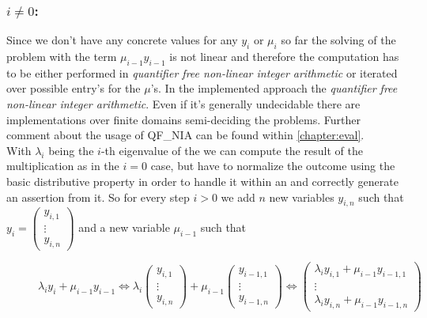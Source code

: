 \subsubsection{$i \ne 0$:}
Since we don't have any concrete values for any $y_i$ or $\mu_i$ so far the solving of the problem with the term $\mu_{i-1}y_{i-1}$ is not linear and therefore the computation has to be either performed in \textit{quantifier free non-linear integer arithmetic} or iterated over possible entry's for the $\mu$'s.\newline
In the implemented approach the \textit{quantifier free non-linear integer arithmetic}. Even if it's generally undecidable there are implementations over finite domains semi-deciding the problems. \cite{behrmann2014bit} \cite{giesl2016} \newline
Further comment about the usage of QF\_NIA can be found within \autoref{chapter:eval}.
\\
With $\lambda_i$ being the $i$-th eigenvalue of the \updatematrix we can compute the result of the multiplication as in the $i=0$ case, but have to normalize the outcome using the basic distributive property in order to handle it within an \rpntree and correctly generate an assertion from it.\newline
So for every step $i > 0$ we add $n$ new variables $y_{i,n}$ such that $y_i = \begin{pmatrix} y_{i,1} \\ \vdots \\ y_{i,n}\end{pmatrix}$ and a new variable $\mu_{i-1}$ such that 
\begin{figure}[H]
	\centering
	$\lambda_i y_i+\mu_{i-1}y_{i-1} \Leftrightarrow \lambda_i \begin{pmatrix} y_{i,1} \\ \vdots \\ y_{i,n}\end{pmatrix} + \mu_{i-1} \begin{pmatrix} y_{i-1,1} \\ \vdots \\ y_{i-1,n}\end{pmatrix} \Leftrightarrow \begin{pmatrix}
		\lambda_i y_{i,1}+\mu_{i-1}y_{i-1,1} \\ \vdots \\ \lambda_i y_{i,n}+\mu_{i-1}y_{i-1,n}
	\end{pmatrix}$ 
\end{figure}

